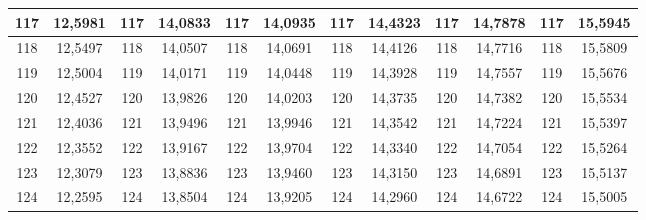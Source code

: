 \documentclass[a4paper,12pt]{article} %
\begin{document}
\begin{longtable}[c]{cccccccccc|c|c|}
	\multicolumn{1}{|c|}{117} & \multicolumn{1}{c|}{12,5981} & \multicolumn{1}{c|}{117} & \multicolumn{1}{c|}{14,0833} & \multicolumn{1}{c|}{117} & \multicolumn{1}{c|}{14,0935} & \multicolumn{1}{c|}{117} & \multicolumn{1}{c|}{14,4323} & \multicolumn{1}{c|}{117} & 14,7878 & 117 & 15,5945 \\ \hline
	\multicolumn{1}{|c|}{118} & \multicolumn{1}{c|}{12,5497} & \multicolumn{1}{c|}{118} & \multicolumn{1}{c|}{14,0507} & \multicolumn{1}{c|}{118} & \multicolumn{1}{c|}{14,0691} & \multicolumn{1}{c|}{118} & \multicolumn{1}{c|}{14,4126} & \multicolumn{1}{c|}{118} & 14,7716 & 118 & 15,5809 \\ \hline
	\multicolumn{1}{|c|}{119} & \multicolumn{1}{c|}{12,5004} & \multicolumn{1}{c|}{119} & \multicolumn{1}{c|}{14,0171} & \multicolumn{1}{c|}{119} & \multicolumn{1}{c|}{14,0448} & \multicolumn{1}{c|}{119} & \multicolumn{1}{c|}{14,3928} & \multicolumn{1}{c|}{119} & 14,7557 & 119 & 15,5676 \\ \hline
	\multicolumn{1}{|c|}{120} & \multicolumn{1}{c|}{12,4527} & \multicolumn{1}{c|}{120} & \multicolumn{1}{c|}{13,9826} & \multicolumn{1}{c|}{120} & \multicolumn{1}{c|}{14,0203} & \multicolumn{1}{c|}{120} & \multicolumn{1}{c|}{14,3735} & \multicolumn{1}{c|}{120} & 14,7382 & 120 & 15,5534 \\ \hline
	\multicolumn{1}{|c|}{121} & \multicolumn{1}{c|}{12,4036} & \multicolumn{1}{c|}{121} & \multicolumn{1}{c|}{13,9496} & \multicolumn{1}{c|}{121} & \multicolumn{1}{c|}{13,9946} & \multicolumn{1}{c|}{121} & \multicolumn{1}{c|}{14,3542} & \multicolumn{1}{c|}{121} & 14,7224 & 121 & 15,5397 \\ \hline
	\multicolumn{1}{|c|}{122} & \multicolumn{1}{c|}{12,3552} & \multicolumn{1}{c|}{122} & \multicolumn{1}{c|}{13,9167} & \multicolumn{1}{c|}{122} & \multicolumn{1}{c|}{13,9704} & \multicolumn{1}{c|}{122} & \multicolumn{1}{c|}{14,3340} & \multicolumn{1}{c|}{122} & 14,7054 & 122 & 15,5264 \\ \hline
	\multicolumn{1}{|c|}{123} & \multicolumn{1}{c|}{12,3079} & \multicolumn{1}{c|}{123} & \multicolumn{1}{c|}{13,8836} & \multicolumn{1}{c|}{123} & \multicolumn{1}{c|}{13,9460} & \multicolumn{1}{c|}{123} & \multicolumn{1}{c|}{14,3150} & \multicolumn{1}{c|}{123} & 14,6891 & 123 & 15,5137 \\ \hline
	\multicolumn{1}{|c|}{124} & \multicolumn{1}{c|}{12,2595} & \multicolumn{1}{c|}{124} & \multicolumn{1}{c|}{13,8504} & \multicolumn{1}{c|}{124} & \multicolumn{1}{c|}{13,9205} & \multicolumn{1}{c|}{124} & \multicolumn{1}{c|}{14,2960} & \multicolumn{1}{c|}{124} & 14,6722 & 124 & 15,5005 \\ \hline

\end{longtable}
\end{document}
